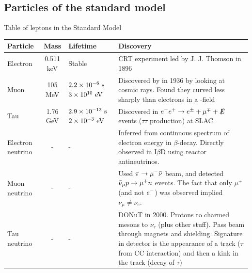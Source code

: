 \subsection{Particles of the standard model}
\begin{table}
\begin{center}
Table of leptons in the Standard Model \\
\def\arraystretch{1.5}
\begin{tabular}{|l||c|p{}|p{}|}
\hline
Particle & Mass & Lifetime & Discovery\\
\hline
\hline
Electron & 0.511 keV & Stable & CRT experiment led by J. J. Thomson in 1896\\
\hline
Muon & 105 MeV & $2.2\times 10^{-6}~\text{s}$ \newline $3\times 10^{10}~\text{eV}$ & Discovered by in 1936 by looking at cosmic rays. Found they curved less sharply than electrons in a \B-field\\
\hline
Tau & 1.76 GeV & $2.9\times 10^{-13}~\text{s}$ \newline $2\times 10^{-3}~\text{eV}$ & Discovered in $e^{-}e^{+} \rightarrow e^\pm + \mu^\mp + \slashed{E}$ events ($\tau\tau$ production) at SLAC.\\
\hline
Electron neutrino & - & - & Inferred from continuous spectrum of electron energy in $\beta$-decay. Directly observed in I$\beta$D using reactor antineutrinos.\\
\hline
Muon neutrino & - & - & Used $\pi \rightarrow \mu^- {\bar{\nu}}$ beam, and detected ${\bar{\nu}}_\mu p \rightarrow \mu^+ n$ events. The fact that only $\mu^+$ (and not $e^{-}$) was observed implied $\nu_\mu \neq \nu_e$.\\
\hline
Tau neutrino & - & - & DONuT in 2000. Protons to charmed mesons to $\nu_\tau$ (plus other stuff). Pass beam through magnets and shielding. Signature in detector is the appearance of a track ($\tau$ from CC interaction) and then a kink in the track (decay of $\tau$)  \\
\hline
\end{tabular}
\vspace{5mm}


\end{center}
\end{table}
